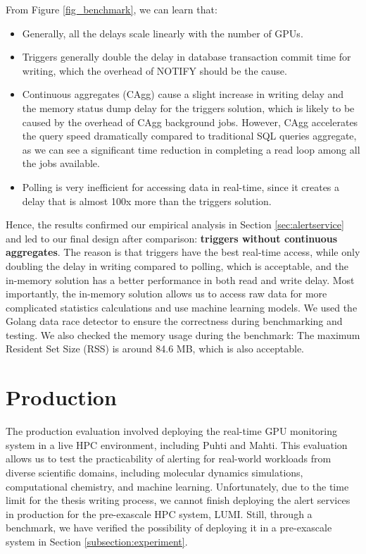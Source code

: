 From Figure \ref{fig_benchmark}, we can learn that:

\begin{itemize}
    \item Generally, all the delays scale linearly with the number of GPUs.
    \item Triggers generally double the delay in database transaction commit time for writing, which the overhead of NOTIFY should be the cause.
    \item Continuous aggregates (CAgg) cause a slight increase in writing delay and the memory status dump delay for the triggers solution, which is likely to be caused by the overhead of CAgg background jobs. However, CAgg accelerates the query speed dramatically compared to traditional SQL queries aggregate, as we can see a significant time reduction in completing a read loop among all the jobs available.
    \item Polling is very inefficient for accessing data in real-time, since it creates a delay that is almost 100x more than the triggers solution.
\end{itemize}

Hence, the results confirmed our empirical analysis in Section \ref{sec:alertservice} and led to our final design after comparison: \textbf{triggers without continuous aggregates}. The reason is that triggers have the best real-time access, while only doubling the delay in writing compared to polling, which is acceptable, and the in-memory solution has a better performance in both read and write delay. Most importantly, the in-memory solution allows us to access raw data for more complicated statistics calculations and use machine learning models. We used the Golang data race detector to ensure the correctness during benchmarking and testing. We also checked the memory usage during the benchmark: The maximum Resident Set Size (RSS) is around 84.6 MB, which is also acceptable.


\section{Production}

The production evaluation involved deploying the real-time GPU monitoring system in a live HPC environment, including Puhti and Mahti. This evaluation allows us to test the practicability of alerting for real-world workloads from diverse scientific domains, including molecular dynamics simulations, computational chemistry, and machine learning. Unfortunately, due to the time limit for the thesis writing process, we cannot finish deploying the alert services in production for the pre-exascale HPC system, LUMI. Still, through a benchmark, we have verified the possibility of deploying it in a pre-exascale system in Section \ref{subsection:experiment}.

